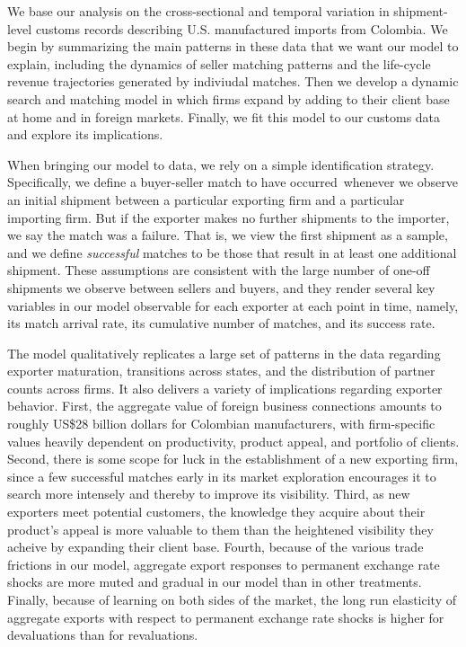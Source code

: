 \documentclass[12pt]{article}
\begin{document}
We base our analysis on the cross-sectional and temporal variation in
shipment-level customs records describing U.S. manufactured imports from
Colombia. We begin by summarizing the main patterns in these data that we
want our model to explain, including the dynamics of seller matching
patterns and the life-cycle revenue trajectories generated by indiviudal
matches. Then we develop a dynamic search and matching model in which firms
expand by adding to their client base at home and in foreign markets.
Finally, we fit this model to our customs data and explore its implications.

When bringing our model to data, we rely on a simple identification
strategy. Specifically, we define a buyer-seller match to have occurred\
whenever we observe an initial shipment between a particular exporting firm
and a particular importing firm. But if the exporter makes no further
shipments to the importer, we say the match was a failure. That is, we view
the first shipment as a sample, and we define \textit{successful} matches to
be those that result in at least one additional shipment. These assumptions
are consistent with the large number of one-off shipments we observe between
sellers and buyers, and they render several key variables in our model
observable for each exporter at each point in time, namely, its match
arrival rate, its cumulative number of matches, and its success rate.

The model qualitatively replicates a large set of patterns in the data
regarding exporter maturation, transitions across states, and the
distribution of partner counts across firms. It also delivers a variety of
implications regarding exporter behavior. First, the aggregate value of foreign
business connections amounts to roughly US\$28 billion dollars for Colombian
manufacturers, with firm-specific values heavily dependent on productivity,
product appeal, and portfolio of clients. Second, there is some scope for
luck in the establishment of a new exporting firm, since a few successful
matches early in its market exploration encourages it to search more
intensely and thereby to improve its visibility. Third, as new exporters meet potential customers, the knowledge they acquire about their product's appeal is more valuable to them than the heightened visibility they acheive by expanding their client base. Fourth, because of the various trade frictions in our model, aggregate export responses to permanent exchange rate shocks are more muted and gradual in our model than in other treatments. Finally, because of learning on both sides of the market, the long run elasticity of aggregate
exports with respect to permanent exchange rate shocks is higher for devaluations than for revaluations. 
\end{document}

